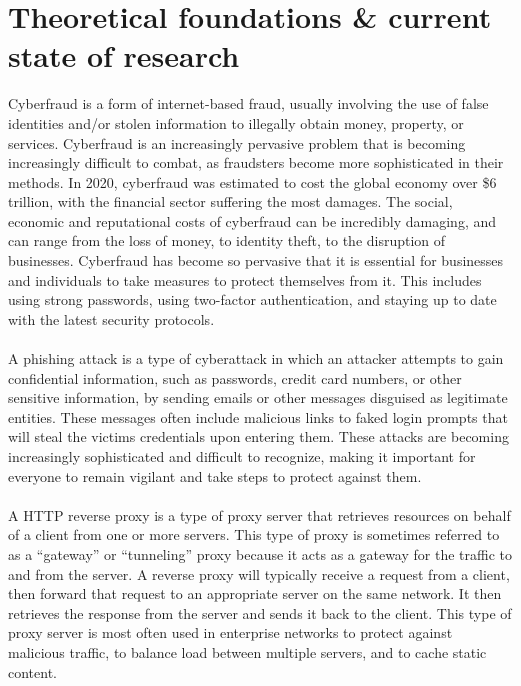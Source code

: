 \documentclass[12pt]{report}
\begin{document}
\section{Theoretical foundations \& current state of research}
Cyberfraud is a form of internet-based fraud, usually involving the use of false
identities and/or stolen information to illegally obtain money, property, or services.
Cyberfraud is an increasingly pervasive problem that is becoming increasingly
difficult to combat, as fraudsters become more sophisticated in their methods.
In 2020, cyberfraud was estimated to cost the global economy over \$6 trillion\cite{6trillion},
with the financial sector suffering the most damages. The social, economic and
reputational costs of cyberfraud can be incredibly damaging, and can range from
the loss of money, to identity theft, to the disruption of businesses.
Cyberfraud has become so pervasive that it is essential for businesses and
individuals to take measures to protect themselves from it. This includes using
strong passwords, using two-factor authentication, and staying up to date with
the latest security protocols.\\ \\
A phishing attack is a type of
cyberattack in which an attacker attempts to gain confidential information, such
as passwords, credit card numbers, or other sensitive information, by sending
emails or other messages disguised as legitimate entities. These messages often
include malicious links to faked login prompts that will steal the victims credentials
upon entering them. These attacks are becoming increasingly sophisticated and
difficult to recognize, making it important for everyone to remain vigilant and
take steps to protect against them. \\ \\
A HTTP reverse proxy is a type of proxy server that retrieves resources on behalf of a client from one or more
servers. This type of proxy is sometimes referred to as a “gateway” or “tunneling”
proxy because it acts as a gateway for the traffic to and from the server. A
reverse proxy will typically receive a request from a client, then forward that
request to an appropriate server on the same network. It then retrieves the
response from the server and sends it back to the client. This type of proxy server
is most often used in enterprise networks to protect against malicious traffic,
to balance load between multiple servers, and to cache static content. \\ \\
\end{document}
